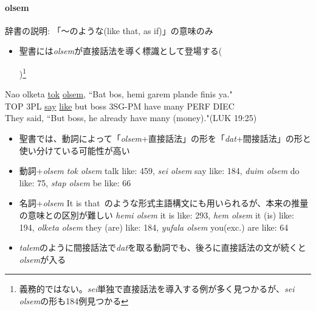 \documentclass[11pt,a4paper]{jsarticle}
\newcounter{tempcnt}
\newcommand{\exn}[1]{%
\setcounter{tempcnt}{\value{exx}}%
\addtocounter{tempcnt}{#1}%
\arabic{tempcnt}}
\begin{document}
\paragraph{olsem} 辞書\citep[157]{dictionary}の説明: 「～のような(like that, as if)」の意味のみ

\begin{itemize}
  \item 聖書には\textit{olsem}が直接話法を導く標識として登場する(\exn{1})\footnote{義務的ではない。\textit{sei}単独で直接話法を導入する例が多く見つかるが、\textit{sei olsem}の形も184例見つかる}
\end{itemize}
\begin{exe}
  \ex
  \gll Nao olketa \underline{tok} \underline{olsem}, ``Bat bos, hemi garem plande finis ya."\\
  TOP 3PL \underline{say} \underline{like} but boss 3SG-PM have many PERF DIEC\\
  \glt They said, ``But boss, he already have many (money)."(LUK 19:25)
\end{exe}
\begin{itemize}
  \item 聖書では、動詞によって「\textit{olsem}+直接話法」の形を「\textit{dat}+間接話法」の形と使い分けている可能性が高い
  \item 動詞+\textit{olsem} \textit{tok olsem} talk like: 459, \textit{sei olsem} say like: 184, \textit{duim olsem} do like: 75, \textit{stap olsem} be like: 66
  \item 名詞+\textit{olsem} It is that~のような形式主語構文にも用いられるが、本来の推量の意味との区別が難しい \textit{hemi olsem} it is like: 293, \textit{hem olsem} it (is) like: 194, \textit{olketa olsem} they (are) like: 184, \textit{yufala olsem} you(exc.) are like: 64
  \item \textit{talem}のように間接話法で\textit{dat}を取る動詞でも、後ろに直接話法の文が続くと\textit{olsem}が入る
\end{itemize}
\end{document}
